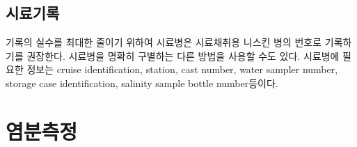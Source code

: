 \documentclass[
]{book}
\begin{document}
\hypertarget{uxc2dcuxb8ccuxae30uxb85d}{%
\subsection{시료기록}\label{uxc2dcuxb8ccuxae30uxb85d}}

기록의 실수를 최대한 줄이기 위하여 시료병은 시료채취용 니스킨 병의 번호로 기록하기를 권장한다. 시료병을 명확히 구별하는 다른 방법을 사용할 수도 있다. 시료병에 필요한 정보는 cruise identification, station, cast number, water sampler number, storage case identification, salinity sample bottle number등이다.

\hypertarget{uxc5fcuxbd84uxce21uxc815}{%
\section{염분측정}\label{uxc5fcuxbd84uxce21uxc815}}
\end{document}
